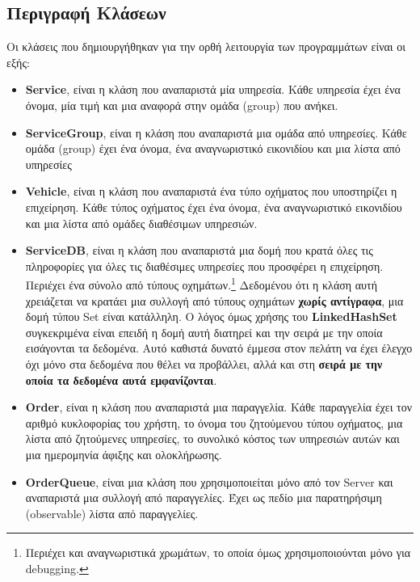         \subsection{Περιγραφή Κλάσεων}
        \label{sec:SectionName1.3.2}
        Οι κλάσεις που δημιουργήθηκαν για την ορθή λειτουργία των προγραμμάτων είναι οι εξής:
        \begin{itemize}
            \item \textbf{Service}, είναι η κλάση που αναπαριστά μία υπηρεσία. Κάθε υπηρεσία έχει ένα όνομα, μία τιμή και μια αναφορά στην ομάδα (group) που ανήκει.
            
            \item \textbf{ServiceGroup}, είναι η κλάση που αναπαριστά μια ομάδα από υπηρεσίες. Κάθε ομάδα (group) έχει ένα όνομα, ένα αναγνωριστικό εικονιδίου και μια λίστα από υπηρεσίες 
            \item \textbf{Vehicle}, είναι η κλάση που αναπαριστά ένα τύπο οχήματος που υποστηρίζει η επιχείρηση. Κάθε τύπος οχήματος έχει ένα όνομα, ένα αναγνωριστικό εικονιδίου και μια λίστα από ομάδες διαθέσιμων υπηρεσιών.  
            \newpage
            
            \item \textbf{ServiceDB}, είναι η κλάση που αναπαριστά μια δομή που κρατά όλες τις πληροφορίες για όλες τις διαθέσιμες υπηρεσίες που προσφέρει η επιχείρηση. Περιέχει ένα σύνολο από τύπους οχημάτων.\footnote{Περιέχει και αναγνωριστικά χρωμάτων, το οποία όμως χρησιμοποιούνται μόνο για debugging.} Δεδομένου ότι η κλάση αυτή χρειάζεται να κρατάει μια συλλογή από τύπους οχημάτων \textbf{χωρίς αντίγραφα}, μια δομή τύπου Set είναι κατάλληλη. Ο λόγος όμως χρήσης του \textbf{LinkedHashSet} συγκεκριμένα είναι επειδή η δομή αυτή διατηρεί και την σειρά με την οποία εισάγονται τα δεδομένα. Αυτό καθιστά δυνατό έμμεσα στον πελάτη να έχει έλεγχο όχι μόνο στα δεδομένα που θέλει να προβάλλει, αλλά και στη \textbf{σειρά με την οποία τα δεδομένα αυτά εμφανίζονται}.

            \item \textbf{Order}, είναι η κλάση που αναπαριστά μια παραγγελία. Κάθε παραγγελία έχει τον αριθμό κυκλοφορίας του χρήστη, το όνομα του ζητούμενου τύπου οχήματος, μια λίστα από ζητούμενες υπηρεσίες, το συνολικό κόστος των υπηρεσιών αυτών και μια ημερομηνία άφιξης και ολοκλήρωσης.  

            \item \textbf{OrderQueue}, είναι μια κλάση που χρησιμοποιείται μόνο από τον Server και αναπαριστά μια συλλογή από παραγγελίες. Έχει ως πεδίο μια παρατηρήσιμη (observable) λίστα από παραγγελίες.
            

\end{itemize}

